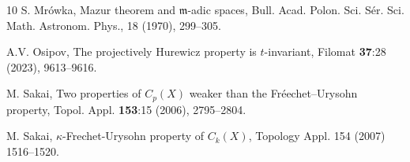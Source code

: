 \documentclass[preprint,11pt]{elsarticle}
\theoremstyle{definition}
\theoremstyle{remark}
\numberwithin{equation}{section}
\numberwithin{theorem}{section}
\begin{document}
\begin{thebibliography}{10}
S. Mr\'{o}wka, Mazur theorem and $\mathfrak{m}$-adic spaces, Bull. Acad. Polon. Sci. S\'{e}r. Sci. Math. Astronom. Phys., 18 (1970), 299--305.

A.V. Osipov, The projectively Hurewicz property is $t$-invariant, Filomat \textbf{37}:28 (2023), 9613--9616.

M. Sakai, Two properties of $C_p(X)$ weaker than the Fr\'{e}echet--Urysohn property, Topol. Appl. \textbf{153}:15 (2006), 2795--2804.

M. Sakai, $\kappa$-Frechet-Urysohn property of $C_k(X)$, Topology Appl. 154 (2007) 1516--1520.

\end{thebibliography}
\end{document}
